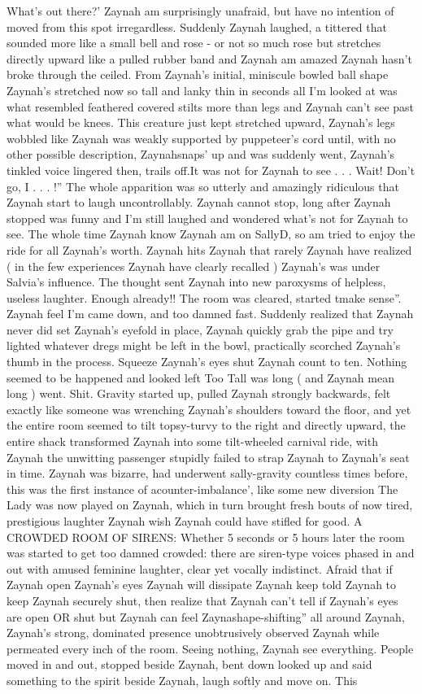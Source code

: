 \documentclass[12pt]{book}
\begin{document}
What's out there?' Zaynah am surprisingly unafraid, but have no intention of moved from this spot irregardless. Suddenly Zaynah laughed, a tittered that sounded more like a small bell and rose - or not so much rose but stretches directly upward like a pulled rubber band and Zaynah am amazed Zaynah hasn't broke through the ceiled. From Zaynah's initial, miniscule bowled ball shape Zaynah's stretched now so tall and lanky thin in seconds all I'm looked at was what resembled feathered covered stilts more than legs and Zaynah can't see past what would be knees. This creature just kept stretched upward, Zaynah's legs wobbled like Zaynah was weakly supported by puppeteer's cord until, with no other possible description, Zaynahsnaps' up and was suddenly went, Zaynah's tinkled voice lingered then, trails off.It was not for Zaynah to see . . .  Wait! Don't go, I . . . !'' The whole apparition was so utterly and amazingly ridiculous that Zaynah start to laugh uncontrollably. Zaynah cannot stop, long after Zaynah stopped was funny and I'm still laughed and wondered what's not for Zaynah to see. The whole time Zaynah know Zaynah am on SallyD, so am tried to enjoy the ride for all Zaynah's worth. Zaynah hits Zaynah that rarely Zaynah have realized ( in the few experiences Zaynah have clearly recalled ) Zaynah's was under Salvia's influence. The thought sent Zaynah into new paroxysms of helpless, useless laughter. Enough already!! The room was cleared, started tmake sense''. Zaynah feel I'm came down, and too damned fast. Suddenly realized that Zaynah never did set Zaynah's eyefold in place, Zaynah quickly grab the pipe and try lighted whatever dregs might be left in the bowl, practically scorched Zaynah's thumb in the process. Squeeze Zaynah's eyes shut Zaynah count to ten. Nothing seemed to be happened and looked left Too Tall was long ( and Zaynah mean long ) went. Shit. Gravity started up, pulled Zaynah strongly backwards, felt exactly like someone was wrenching Zaynah's shoulders toward the floor, and yet the entire room seemed to tilt topsy-turvy to the right and directly upward, the entire shack transformed Zaynah into some tilt-wheeled carnival ride, with Zaynah the unwitting passenger stupidly failed to strap Zaynah to Zaynah's seat in time. Zaynah was bizarre, had underwent sally-gravity countless times before, this was the first instance of acounter-imbalance', like some new diversion The Lady was now played on Zaynah, which in turn brought fresh bouts of now tired, prestigious laughter Zaynah wish Zaynah could have stifled for good. A CROWDED ROOM OF SIRENS: Whether 5 seconds or 5 hours later the room was started to get too damned crowded: there are siren-type voices phased in and out with amused feminine laughter, clear yet vocally indistinct. Afraid that if Zaynah open Zaynah's eyes Zaynah will dissipate Zaynah keep told Zaynah to keep Zaynah securely shut, then realize that Zaynah can't tell if Zaynah's eyes are open OR shut but Zaynah can feel Zaynashape-shifting'' all around Zaynah, Zaynah's strong, dominated presence unobtrusively observed Zaynah while permeated every inch of the room. Seeing nothing, Zaynah see everything. People moved in and out, stopped beside Zaynah, bent down looked up and said something to the spirit beside Zaynah, laugh softly and move on. This 
\end{document}
